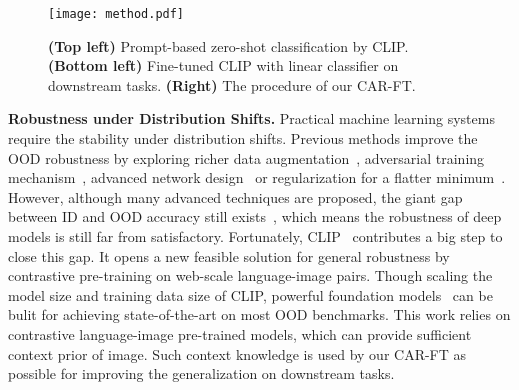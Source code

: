 \documentclass[pdflatex,sn-basic,iicol]{sn-jnl}
\theoremstyle{thmstyleone}\newtheorem{theorem}{Theorem}\newtheorem{proposition}[theorem]{Proposition}
\theoremstyle{thmstyletwo}\newtheorem{example}{Example}\newtheorem{remark}{Remark}
\theoremstyle{thmstylethree}\newtheorem{definition}{Definition}
\begin{document}
\begin{figure*}[t]
    \centering
    \texttt{[image: method.pdf]}
    \caption{\textbf{(Top left)} Prompt-based zero-shot classification by CLIP. \textbf{(Bottom left)} Fine-tuned CLIP with linear classifier on downstream tasks. \textbf{(Right)} The procedure of our CAR-FT. }
    \label{fig:method}
\end{figure*}

\noindent\textbf{Robustness under Distribution Shifts.} Practical machine learning systems require the stability under distribution shifts. Previous methods improve the OOD robustness by exploring richer data augmentation~\citep{hendrycks2019augmix,hendrycks2021many}, adversarial training mechanism~\citep{xie2020adversarial,mao2022enhance,herrmann2022pyramid}, advanced network design~\citep{paul2022vision,mao2022towards,bai2021ood,wang2022can} or regularization for a flatter minimum~\citep{cha2021swad,foret2020sharpness}. However, although many advanced techniques are proposed, the giant gap between ID and OOD accuracy still exists~\citep{miller2021accuracy}, which means the robustness of deep models is still far from satisfactory. Fortunately, CLIP~\citep{radford2021learning} contributes a big step to close this gap. It opens a new feasible solution for general robustness by contrastive pre-training on web-scale language-image pairs. Though scaling the model size and training data size of CLIP, powerful foundation models~\citep{pham2021combined,jia2021scaling} can be bulit for achieving state-of-the-art on most OOD benchmarks. This work relies on contrastive language-image pre-trained models, which can provide sufficient context prior of image. Such context knowledge is used by our CAR-FT as possible for improving the generalization on downstream tasks.
\end{document}
